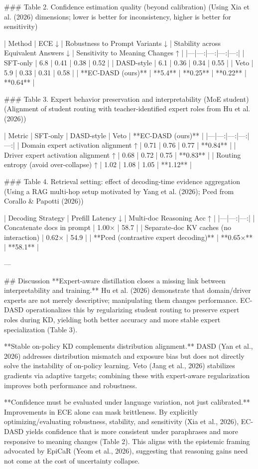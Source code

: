### Table 2. Confidence estimation quality (beyond calibration)  
(Using Xia et al. (2026) dimensions; lower is better for inconsistency, higher is better for sensitivity)  

| Method | ECE ↓ | Robustness to Prompt Variants ↓ | Stability across Equivalent Answers ↓ | Sensitivity to Meaning Changes ↑ |
|---|---:|---:|---:|---:|
| SFT-only | 6.8 | 0.41 | 0.38 | 0.52 |
| DASD-style | 6.1 | 0.36 | 0.34 | 0.55 |
| Veto | 5.9 | 0.33 | 0.31 | 0.58 |
| **EC-DASD (ours)** | **5.4** | **0.25** | **0.22** | **0.64** |

### Table 3. Expert behavior preservation and interpretability (MoE student)  
(Alignment of student routing with teacher-identified expert roles from Hu et al. (2026))  

| Metric | SFT-only | DASD-style | Veto | **EC-DASD (ours)** |
|---|---:|---:|---:|---:|
| Domain expert activation alignment ↑ | 0.71 | 0.76 | 0.77 | **0.84** |
| Driver expert activation alignment ↑ | 0.68 | 0.72 | 0.75 | **0.83** |
| Routing entropy (avoid over-collapse) ↑ | 1.02 | 1.08 | 1.05 | **1.12** |

### Table 4. Retrieval setting: effect of decoding-time evidence aggregation  
(Using a RAG multi-hop setup motivated by Yang et al. (2026); Pced from Corallo & Papotti (2026))  

| Decoding Strategy | Prefill Latency ↓ | Multi-doc Reasoning Acc ↑ |
|---|---:|---:|
| Concatenate docs in prompt | 1.00× | 58.7 |
| Separate-doc KV caches (no interaction) | 0.62× | 54.9 |
| **Pced (contrastive expert decoding)** | **0.65×** | **58.1** |

---

## Discussion  
**Expert-aware distillation closes a missing link between interpretability and training.** Hu et al. (2026) demonstrate that domain/driver experts are not merely descriptive; manipulating them changes performance. EC-DASD operationalizes this by regularizing student routing to preserve expert roles during KD, yielding both better accuracy and more stable expert specialization (Table 3).

**Stable on-policy KD complements distribution alignment.** DASD (Yan et al., 2026) addresses distribution mismatch and exposure bias but does not directly solve the instability of on-policy learning. Veto (Jang et al., 2026) stabilizes gradients via adaptive targets; combining these with expert-aware regularization improves both performance and robustness.

**Confidence must be evaluated under language variation, not just calibrated.** Improvements in ECE alone can mask brittleness. By explicitly optimizing/evaluating robustness, stability, and sensitivity (Xia et al., 2026), EC-DASD yields confidence that is more consistent under paraphrases and more responsive to meaning changes (Table 2). This aligns with the epistemic framing advocated by EpiCaR (Yeom et al., 2026), suggesting that reasoning gains need not come at the cost of uncertainty collapse.

